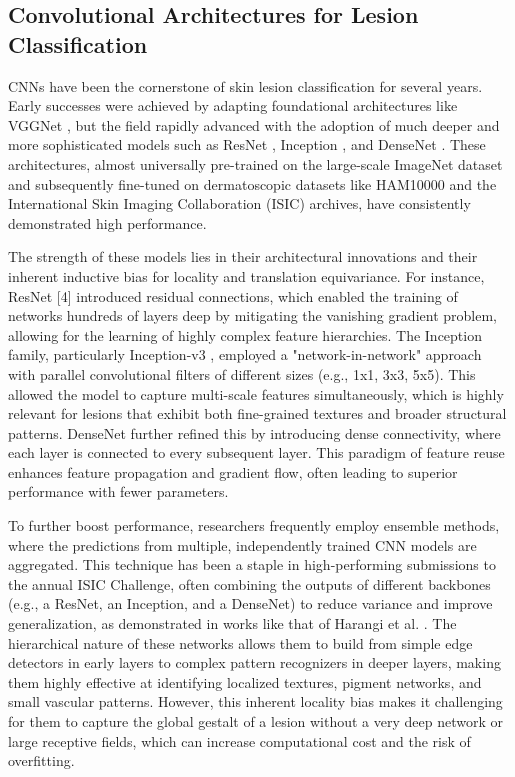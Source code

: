 \subsection{Convolutional Architectures for Lesion Classification}
CNNs have been the cornerstone of skin lesion classification for several years. Early successes were achieved by adapting foundational architectures like VGGNet \cite{simonyan2014vgg}, but the field rapidly advanced with the adoption of much deeper and more sophisticated models such as ResNet \cite{he2016resnet}, Inception \cite{szegedy2016inception}, and DenseNet \cite{huang2017densenet}. These architectures, almost universally pre-trained on the large-scale ImageNet dataset and subsequently fine-tuned on dermatoscopic datasets like HAM10000 \cite{tschandl2018ham10000} and the International Skin Imaging Collaboration (ISIC) archives, have consistently demonstrated high performance.

The strength of these models lies in their architectural innovations and their inherent inductive bias for locality and translation equivariance. For instance, ResNet [4] introduced residual connections, which enabled the training of networks hundreds of layers deep by mitigating the vanishing gradient problem, allowing for the learning of highly complex feature hierarchies. The Inception family, particularly Inception-v3 \cite{szegedy2016inception}, employed a "network-in-network" approach with parallel convolutional filters of different sizes (e.g., 1x1, 3x3, 5x5). This allowed the model to capture multi-scale features simultaneously, which is highly relevant for lesions that exhibit both fine-grained textures and broader structural patterns. DenseNet \cite{huang2017densenet} further refined this by introducing dense connectivity, where each layer is connected to every subsequent layer. This paradigm of feature reuse enhances feature propagation and gradient flow, often leading to superior performance with fewer parameters.

To further boost performance, researchers frequently employ ensemble methods, where the predictions from multiple, independently trained CNN models are aggregated. This technique has been a staple in high-performing submissions to the annual ISIC Challenge, often combining the outputs of different backbones (e.g., a ResNet, an Inception, and a DenseNet) to reduce variance and improve generalization, as demonstrated in works like that of Harangi et al. \cite{harangi2018ensemble}. The hierarchical nature of these networks allows them to build from simple edge detectors in early layers to complex pattern recognizers in deeper layers, making them highly effective at identifying localized textures, pigment networks, and small vascular patterns. However, this inherent locality bias makes it challenging for them to capture the global gestalt of a lesion without a very deep network or large receptive fields, which can increase computational cost and the risk of overfitting.

